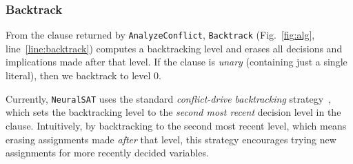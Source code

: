 \documentclass[oneside,11pt,dvipsnames]{book}
\numberwithin{equation}{section}
\theoremstyle{definition}
\theoremstyle{remark}
\newcommand{\tvn}[1]{\iftoggle{usecomment}{{\color{red}{[TVN]: #1}}}{}}
\newcommand{\hd}[1]{\iftoggle{usecomment}{{\color{blue}{[HD]: #1}}}{}}
\newcommand{\tool}{\texttt{NeuralSAT}}
\begin{document}




\subsubsection{Backtrack} \label{sec:backtrack}
From the clause returned by \texttt{AnalyzeConflict}, \texttt{Backtrack}  (Fig.~\ref{fig:alg}, line~\ref{line:backtrack}) computes a backtracking level and erases all decisions and implications made after that level.
If the clause is \emph{unary} (containing just a single literal), then we backtrack to level 0. %

Currently, \tool{} uses the standard \emph{conflict-drive backtracking} strategy~\cite{barrett2013decision}, which sets the backtracking level to the \emph{second most recent} decision level in the clause.
Intuitively, by backtracking to the second most recent level, which means erasing assignments made \emph{after} that level, this strategy encourages trying new assignments for more recently decided variables.

\end{document}
